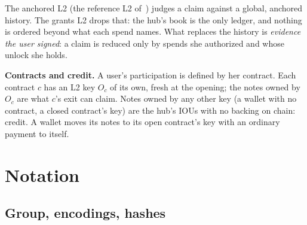 \documentclass[11pt]{article}
\theoremstyle{plain}
\theoremstyle{definition}
\newcommand{\Oc}{O_c}
\begin{document}
The anchored L2 (the reference L2 of~\cite{lichen}) judges a claim
against a global, anchored history. The grants L2 drops that: the hub's
book is the only ledger, and nothing is ordered beyond what each spend
names. What replaces the history is \emph{evidence the user signed}: a
claim is reduced only by spends she authorized and whose unlock she
holds.

\textbf{Contracts and credit.} A user's participation is defined by her
contract. Each contract $c$ has an L2 key $\Oc$ of its own, fresh at the
opening; the notes owned by $\Oc$ are what $c$'s exit can claim. Notes
owned by any other key (a wallet with no contract, a closed contract's
key) are the hub's IOUs with no backing on chain: credit. A wallet moves
its notes to its open contract's key with an ordinary payment to itself.

\section{Notation}\label{sec:notation}

\subsection{Group, encodings, hashes}
\end{document}
